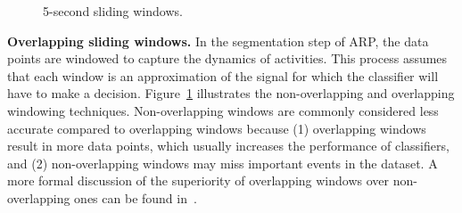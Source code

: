 \documentclass[sigconf]{acmart}
\newcommand{\TG}[1]{\color{red}\textbf{Note TG}: #1\color{black}}
\begin{document}
\begin{figure}[htp]
  \centering
  \quad

   \caption{5-second sliding windows. }
   \label{fig:SlidingWindow}
\end{figure}

\noindent\textbf{Overlapping sliding windows.} In the segmentation step of ARP, the data points are windowed to capture the dynamics of activities. This process assumes that each 
window is an approximation of the signal for which the classifier will 
have to make a decision. Figure~\ref{fig:SlidingWindow} illustrates the 
non-overlapping and overlapping windowing techniques. 
Non-overlapping windows are commonly considered less accurate compared to
overlapping windows because (1) overlapping windows result in more data 
points, which usually increases the performance of classifiers, and (2)
non-overlapping windows may miss important events in the dataset. 
A more formal discussion of the superiority of overlapping windows over non-overlapping ones
can be found in~\cite{coggeshall2005asset}.

\end{document}
